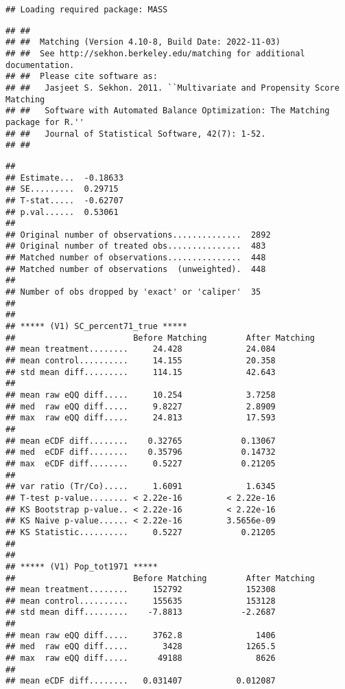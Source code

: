 \documentclass[
]{article}
\begin{document}
\begin{verbatim}
## Loading required package: MASS
\end{verbatim}

\begin{verbatim}
## ## 
## ##  Matching (Version 4.10-8, Build Date: 2022-11-03)
## ##  See http://sekhon.berkeley.edu/matching for additional documentation.
## ##  Please cite software as:
## ##   Jasjeet S. Sekhon. 2011. ``Multivariate and Propensity Score Matching
## ##   Software with Automated Balance Optimization: The Matching package for R.''
## ##   Journal of Statistical Software, 42(7): 1-52. 
## ##
\end{verbatim}

\begin{verbatim}
## 
## Estimate...  -0.18633 
## SE.........  0.29715 
## T-stat.....  -0.62707 
## p.val......  0.53061 
## 
## Original number of observations..............  2892 
## Original number of treated obs...............  483 
## Matched number of observations...............  448 
## Matched number of observations  (unweighted).  448 
## 
## Number of obs dropped by 'exact' or 'caliper'  35 
## 
## 
## ***** (V1) SC_percent71_true *****
##                        Before Matching        After Matching
## mean treatment........     24.428             24.084 
## mean control..........     14.155             20.358 
## std mean diff.........     114.15             42.643 
## 
## mean raw eQQ diff.....     10.254             3.7258 
## med  raw eQQ diff.....     9.8227             2.8909 
## max  raw eQQ diff.....     24.813             17.593 
## 
## mean eCDF diff........    0.32765            0.13067 
## med  eCDF diff........    0.35796            0.14732 
## max  eCDF diff........     0.5227            0.21205 
## 
## var ratio (Tr/Co).....     1.6091             1.6345 
## T-test p-value........ < 2.22e-16         < 2.22e-16 
## KS Bootstrap p-value.. < 2.22e-16         < 2.22e-16 
## KS Naive p-value...... < 2.22e-16         3.5656e-09 
## KS Statistic..........     0.5227            0.21205 
## 
## 
## ***** (V1) Pop_tot1971 *****
##                        Before Matching        After Matching
## mean treatment........     152792             152308 
## mean control..........     155635             153128 
## std mean diff.........    -7.8813            -2.2687 
## 
## mean raw eQQ diff.....     3762.8               1406 
## med  raw eQQ diff.....       3428             1265.5 
## max  raw eQQ diff.....      49188               8626 
## 
## mean eCDF diff........   0.031407           0.012087 

\end{verbatim}
\end{document}

